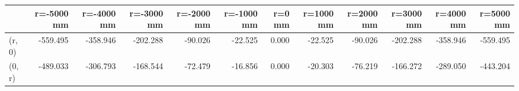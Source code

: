 \documentclass[convert={convertexe={magick.exe}}]{standalone}
\begin{document}
\begin{tabular}{lrrrrrrrrrrr}
\toprule
{} &  r=-5000 mm &  r=-4000 mm &  r=-3000 mm &  r=-2000 mm &  r=-1000 mm &  r=0 mm &  r=1000 mm &  r=2000 mm &  r=3000 mm &  r=4000 mm &  r=5000 mm \\
\midrule
(r, 0) &    -559.495 &    -358.946 &    -202.288 &     -90.026 &     -22.525 &   0.000 &    -22.525 &    -90.026 &   -202.288 &   -358.946 &   -559.495 \\
(0, r) &    -489.033 &    -306.793 &    -168.544 &     -72.479 &     -16.856 &   0.000 &    -20.303 &    -76.219 &   -166.272 &   -289.050 &   -443.204 \\
\bottomrule
\end{tabular}
\end{document}
